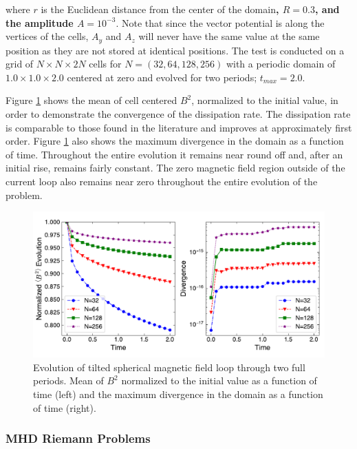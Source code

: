 \documentclass[modern, linenumbers]{aastex631}
\newcommand*{\img}[1]{%
    \raisebox{-.3\baselineskip}{%
        \texttt{[image: \#1]}%
    }%
}
\begin{document}
\noindent where $r$ is the Euclidean distance from the center of the domain\textbf{, $R = 0.3$, and the amplitude $A=10^{-3}$}. Note that since the vector potential is along the vertices of the cells, $A_y$ and $A_z$ will never have the same value at the same position as they are not stored at identical positions. The test is conducted on a grid of $N\times N\times 2N$ cells for $N=(32, 64, 128, 256)$ with a periodic domain of $1.0\times1.0\times2.0$ centered at zero and evolved for two periods; $t_{max} = 2.0$.

Figure \ref{fig:afl} shows the mean of cell centered $B^2$, normalized to the initial value, in order to demonstrate the convergence of the dissipation rate. The dissipation rate is comparable to those found in the literature \citep{stone_athena_2008} and improves at approximately first order. Figure \ref{fig:afl} also shows the maximum divergence in the domain as a function of time. Throughout the entire evolution it remains near round off and, after an initial rise, remains fairly constant. The zero magnetic field region outside of the current loop also remains near zero throughout the entire evolution of the problem.

\begin{figure}[ht!]
    \includegraphics[width=\linewidth]{afl.pdf}
    \caption{Evolution of tilted spherical magnetic field loop through two full periods. Mean of $B^2$ normalized to the initial value as a function of time (left) and the maximum divergence in the domain as a function of time (right). \href{https://github.com/bcaddy/caddy-et-al-2023/blob/a5d284c28192e6ae8b0c09e82f75a36456cf0ca6/python/advecting-field-loop.py}{\img{github.png}}}
    \label{fig:afl}
\end{figure}

\subsubsection{MHD Riemann Problems}
\label{sec:riemann}
\end{document}
